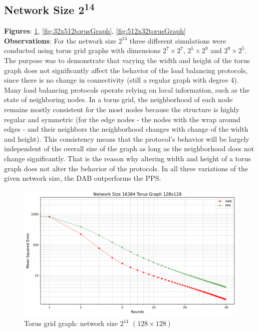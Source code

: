 \subsection{Network Size 2\textsuperscript{14}}
\textbf{Figures}: \ref{fig:16384torusGraph}, \ref{fig:32x512torusGraph}, \ref{fig:512x32torusGraph}\\
\textbf{Observations}: For the network size $2^{14}$ three different simulations were conducted using torus grid graphs with dimensions $2^{7} \times 2^{7}$, $2^{5} \times 2^{9}$ and $2^{9} \times 2^{5}$. The purpose was to demonstrate that varying the width and height of the torus graph does not significantly affect the behavior of the load balancing protocols, since there is no change in connectivity (still a regular graph with degree 4). Many load balancing protocols operate relying on local information, such as the state of neighboring nodes. In a torus grid, the neighborhood of each node remains mostly consistent for the most nodes because the structure is highly regular and symmetric (for the edge nodes - the nodes with the wrap around edges - and their neighbors the neighborhood changes with change of the width and height). This consistency means that the protocol's behavior will be largely independent of the overall size of the graph as long as the neighborhood does not change significantly. That is the reason why altering width and height of a torus graph does not alter the behavior of the protocols. In all three variations of the given network size, the DAB outperforms the PPS.\\
\begin{figure}[H]
    \centering
    \includegraphics[scale=0.5]{figures/torusGridGraphSimulations/128x128/DAB_vs_PPS_TG_r50_n16384.png}
    \caption{Torus grid graph: network size $2^{14}$ $(128\times128)$}
    \label{fig:16384torusGraph}
\end{figure}

